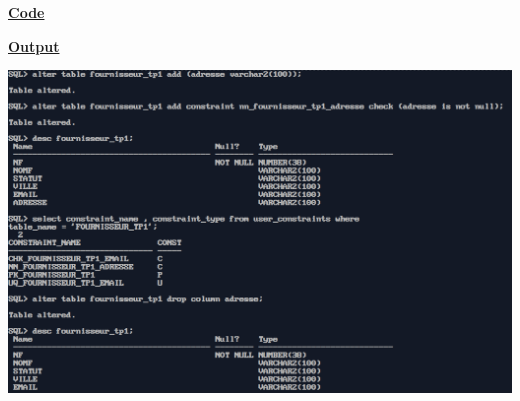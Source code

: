 \newpage
{}
\textbf{\underline{Code}}


\vspace{1cm}
\textbf{\underline{Output}}
\vspace{1cm}
\begin{center}
    \includegraphics[height=0.4\textheight]{Questions/q6/ad.png}
\end{center}


